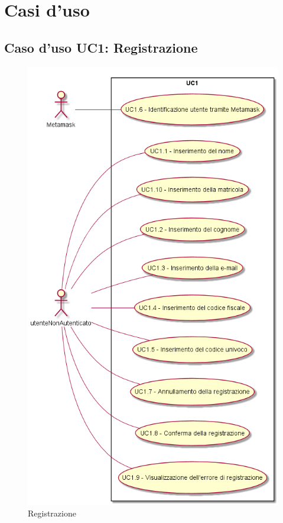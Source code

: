 \section{Casi d'uso}
\subsection{Caso d'uso \texorpdfstring{UC1}{UC1}: Registrazione }
\begin{figure} [H]
\centering
\includegraphics[scale=0.45]{./img/UC1.png}
\caption{Registrazione }\label{}
\end{figure}
